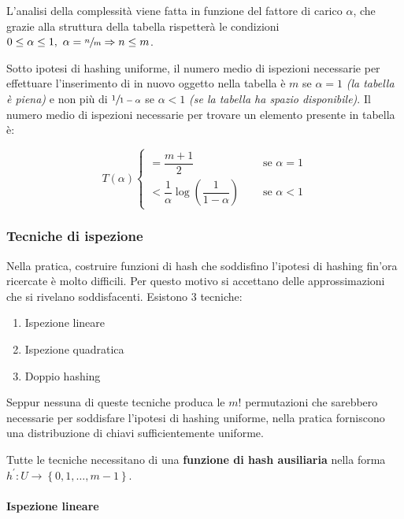\documentclass[italian, 10pt]{article}
\begin{document}
L'analisi della complessità viene fatta in funzione del fattore di carico \(\alpha\), che grazie alla struttura della tabella rispetterà le condizioni \(0 \leq \alpha \leq 1,\ \alpha = \sfrac{n}{m} \Rightarrow n \leq m\).

Sotto ipotesi di hashing uniforme, il numero medio di ispezioni necessarie per effettuare l'inserimento di in nuovo oggetto nella tabella è \(m\) se \(\alpha = 1\) \textit{(la tabella è piena)} e non più di \(\sfrac{1}{1-\alpha}\) se \(\alpha<1\) \textit{(se la tabella ha spazio disponibile)}.
Il numero medio di ispezioni necessarie per trovare un elemento presente in tabella è:

\[  T(\alpha) \begin{cases}
    = \dfrac{m+1}{2}                                         & \quad \text{ se } \alpha = 1 \\[5pt]
    < \dfrac{1}{\alpha} \log\left(\dfrac{1}{1-\alpha}\right) & \quad \text{ se } \alpha < 1
  \end{cases}  \]

\subsubsection{Tecniche di ispezione}

Nella pratica, costruire funzioni di hash che soddisfino l'ipotesi di hashing fin'ora ricercate è molto difficili.
Per questo motivo si accettano delle approssimazioni che si rivelano soddisfacenti.
Esistono \(3\) tecniche:

\begin{enumerate}
  \item Ispezione lineare
  \item Ispezione quadratica
  \item Doppio hashing
\end{enumerate}

Seppur nessuna di queste tecniche produca le \(m!\) permutazioni che sarebbero necessarie per soddisfare l'ipotesi di hashing uniforme, nella pratica forniscono una distribuzione di chiavi sufficientemente uniforme.

Tutte le tecniche necessitano di una \textbf{funzione di hash ausiliaria} nella forma \(h^\prime : U \rightarrow \left\{0, 1, \ldots, m-1\right\}\).

\paragraph{Ispezione lineare}
\end{document}

